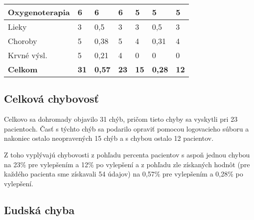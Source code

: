 \begin{table}[h!]
\begin{tabular}{|p{2.3cm}|llp{1.9cm}|llp{1.9cm}|}
		\footnotesize{Oxygenoterapia}   &
		\multicolumn{1}{l|}{6} &
		\multicolumn{1}{l|}{6} &
		6  & 
		\multicolumn{1}{l|}{5} &
		\multicolumn{1}{l|}{5} & 
		5                           
		\\ \hline
		
		\footnotesize{Lieky}   &
		\multicolumn{1}{l|}{3} &
		\multicolumn{1}{l|}{0,5} &
		3  & 
		\multicolumn{1}{l|}{3} &
		\multicolumn{1}{l|}{0,5} & 
		3                          
		\\ \hline
		
		\footnotesize{Choroby}   &
		\multicolumn{1}{l|}{5} &
		\multicolumn{1}{l|}{0,38} &
		5  & 
		\multicolumn{1}{l|}{4} &
		\multicolumn{1}{l|}{0,31} & 
		4                           
		\\ \hline
		
		\footnotesize{Krvné výsl.}   &
		\multicolumn{1}{l|}{5} &
		\multicolumn{1}{l|}{0,21} &
		4  & 
		\multicolumn{1}{l|}{0} &
		\multicolumn{1}{l|}{0} & 
		0                           
		\\ \hline
		
		\footnotesize{\textbf{Celkom}}   &
		\multicolumn{1}{l|}{\textbf{31}} &
		\multicolumn{1}{l|}{\textbf{0,57}} &
		\textbf{23}  & 
		\multicolumn{1}{l|}{\textbf{15}} &
		\multicolumn{1}{l|}{\textbf{0,28}} & 
		\textbf{12}                           
		\\ \hline
	\end{tabular}
\end{table}

\subsection{Celková chybovosť}

Celkovo sa dohromady objavilo 31 chýb, pričom tieto chyby sa vyskytli pri 23 pacientoch. Časť s týchto chýb sa podarilo opraviť pomocou logovacieho súboru a nakoniec ostalo neopravených 15 chýb a s chybou ostalo 12 pacientov.

Z toho vyplývajú chybovosti z pohľadu percenta pacientov s aspoň jednou chybou na 23\% pre vylepšením a 12\% po vylepšení a z pohľadu zle získaných hodnôt (pre každého pacienta sme získavali 54 údajov) na 0,57\% pre vylepšením a 0,28\% po vylepšení.

\subsection{Ľudská chyba}
\label{ludChyba}

